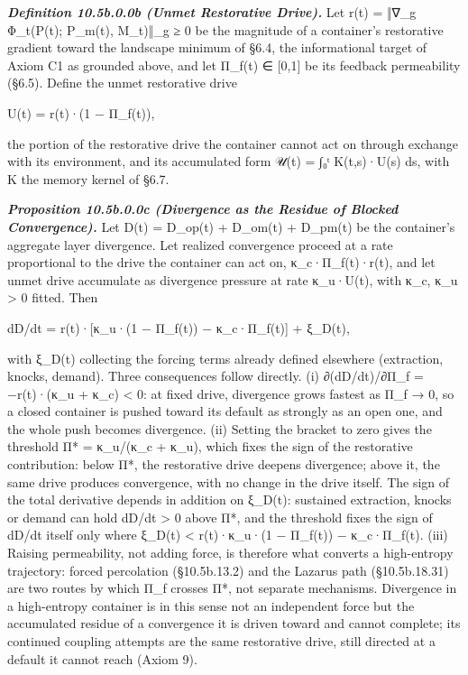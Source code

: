 \documentclass[
]{article}
\begin{document}
\emph{\textbf{Definition 10.5b.0.0b (Unmet Restorative Drive).}} Let
r(t) = ‖∇\_g Φ\_t(P(t); P\_m(t), M\_t)‖\_g ≥ 0 be the magnitude of a
container's restorative gradient toward the landscape minimum of §6.4,
the informational target of Axiom C1 as grounded above, and let Π\_f(t)
∈ {[}0,1{]} be its feedback permeability (§6.5). Define the unmet
restorative drive

U(t) = r(t)·(1 − Π\_f(t)),

the portion of the restorative drive the container cannot act on through
exchange with its environment, and its accumulated form 𝒰(t) = ∫₀ᵗ
K(t,s)·U(s) ds, with K the memory kernel of §6.7.

\emph{\textbf{Proposition 10.5b.0.0c (Divergence as the Residue of
Blocked Convergence).}} Let D(t) = D\_op(t) + D\_om(t) + D\_pm(t) be the
container's aggregate layer divergence. Let realized convergence proceed
at a rate proportional to the drive the container can act on,
κ\_c·Π\_f(t)·r(t), and let unmet drive accumulate as divergence pressure
at rate κ\_u·U(t), with κ\_c, κ\_u \textgreater{} 0 fitted. Then

dD/dt = r(t)·{[}κ\_u·(1 − Π\_f(t)) − κ\_c·Π\_f(t){]} + ξ\_D(t),

with ξ\_D(t) collecting the forcing terms already defined elsewhere
(extraction, knocks, demand). Three consequences follow directly. (i)
∂(dD/dt)/∂Π\_f = −r(t)·(κ\_u + κ\_c) \textless{} 0: at fixed drive,
divergence grows fastest as Π\_f → 0, so a closed container is pushed
toward its default as strongly as an open one, and the whole push
becomes divergence. (ii) Setting the bracket to zero gives the threshold
Π* = κ\_u/(κ\_c + κ\_u), which fixes the sign of the restorative
contribution: below Π*, the restorative drive deepens divergence; above
it, the same drive produces convergence, with no change in the drive
itself. The sign of the total derivative depends in addition on ξ\_D(t):
sustained extraction, knocks or demand can hold dD/dt \textgreater{} 0
above Π*, and the threshold fixes the sign of dD/dt itself only where
\textbar ξ\_D(t)\textbar{} \textless{} r(t)·\textbar κ\_u·(1 − Π\_f(t))
− κ\_c·Π\_f(t)\textbar. (iii) Raising permeability, not adding force, is
therefore what converts a high-entropy trajectory: forced percolation
(§10.5b.13.2) and the Lazarus path (§10.5b.18.31) are two routes by
which Π\_f crosses Π*, not separate mechanisms. Divergence in a
high-entropy container is in this sense not an independent force but the
accumulated residue of a convergence it is driven toward and cannot
complete; its continued coupling attempts are the same restorative
drive, still directed at a default it cannot reach (Axiom 9).
\end{document}
